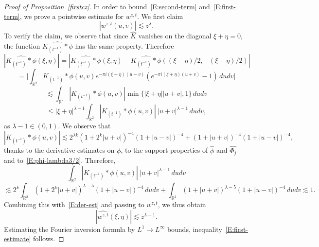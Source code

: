 \documentclass[12pt,reqno]{amsart}
\theoremstyle{plain}
\theoremstyle{definition}
\numberwithin{equation}{section}
\newcommand{\R}{{\mathbb R}}
\def\wh{\widehat}
\begin{document}
\begin{proof}[Proof of Proposition~\ref{firstcz}]
In order to bound~\eqref{E:second-term} and~\eqref{E:first-term}, we prove a pointwise estimate for $w^{z,t}$. We first claim
\begin{equation}\label{E:first-estimate}
|w^{z,t}(u,v)| 
\lesssim z^\lambda.
\end{equation}
To verify the claim, we observe that
since $\wh{K}$ vanishes on the diagonal $\xi+\eta=0$, the function $\wh{K_{(t^{-1})} \ast \phi}$ has the same property. 
Therefore
\begin{equation}\label{E:der-est}
    |\wh{K_{(t^{-1})} \ast \phi}(\xi,\eta)|
=|\wh{K_{(t^{-1})} \ast \phi}(\xi,\eta)-\wh{K_{(t^{-1})} \ast \phi}((\xi-\eta)/2,-(\xi-\eta)/2)|
\end{equation}
\begin{equation*}
=\Big|\int_{\R^2} K_{(t^{-1})} \ast \phi(u,v) e^{-\pi i(\xi-\eta)(u-v)} (e^{-\pi i(\xi+\eta)(u+v)}-1) \,du dv\Big|
\end{equation*}
\begin{equation*}
\lesssim \int_{\R^2} |K_{(t^{-1})} \ast \phi(u,v)| \min\{|\xi+\eta||u+v|,1\}\,du dv
\end{equation*}
\begin{equation*}
\leq |\xi+\eta|^{\lambda-1} \int_{\R^2} |K_{(t^{-1})} \ast \phi(u,v)| ~ |u+v|^{\lambda-1}\,du dv,
\end{equation*}
as $\lambda-1 \in (0,1)$.
We observe that 
\begin{equation}\label{E:kt}
|K_{(t^{-1})} \ast \phi(u,v)| \lesssim 2^{\lambda k}(1+2^k|u+v|)^{-4} (1+|u-v|)^{-4} +  (1+|u+v|)^{-4} (1+|u-v|)^{-4},
\end{equation}
thanks to the derivative estimates on $\phi$, to the support properties of $\wh{\phi}$ and $\wh{\Phi_j}$ and to~\eqref{E:phi-lambda3/2}.
Therefore,
\begin{equation*}
\int_{\R^2} |K_{(t^{-1})} \ast \phi(u,v)|~ |u+v|^{\lambda-1}\,du dv
\end{equation*}
\begin{equation*}
\lesssim 2^{k} \int_{\R^2} (1+2^k|u+v|)^{\lambda-5} (1+|u-v|)^{-4}\, du dv
+ \int_{\R^2} (1+|u+v|)^{\lambda-5} (1+|u-v|)^{-4}\, du dv
\lesssim 1.
\end{equation*}
 Combining this with~\eqref{E:der-est} and passing to $w^{z,t}$, we thus obtain
\[
|\wh{w^{z,t}}(\xi,\eta)|
\lesssim z^{\lambda-1}. 
\]
Estimating the Fourier inversion formula by $L^1 \rightarrow L^\infty$ bounds, inequality~\eqref{E:first-estimate} follows.


\end{proof}
\end{document}
